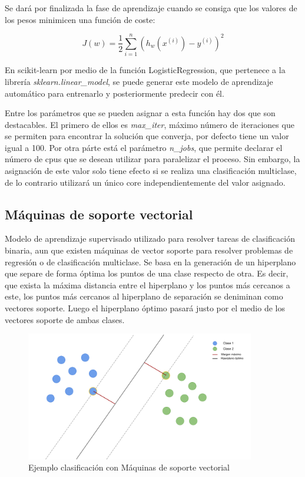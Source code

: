 \documentclass[a4paper, 12pt]{book}
\begin{document}
Se dará por finalizada la fase de aprendizaje cuando se consiga que los valores de los pesos minimicen una función de coste:

\begin{equation}
    J(w) = \frac{1}{2} \sum_{i= 1}^{n} {(h_w(x^{(i)}) - y^{(i)})}^2 
\end{equation}

En scikit-learn por medio de la función LogisticRegression\cite{LogisticRegressionDoc}, que pertenece a la librería \textit{sklearn.linear\_model}, se puede generar este modelo de aprendizaje automático para entrenarlo y posteriormente predecir con él. 

Entre los parámetros que se pueden asignar a esta función hay dos que son destacables. El primero de ellos es \textit{max\_iter}, máximo número de iteraciones que se permiten para encontrar la solución que converja, por defecto tiene un valor igual a 100. Por otra párte está el parámetro \textit{n\_jobs}, que permite declarar el número de cpus que se desean utilizar para paralelizar el proceso. Sin embargo, la asignación de este valor solo tiene efecto si se realiza una clasificación multiclase, de lo contrario utilizará un único core independientemente del valor asignado.

\subsection{Máquinas de soporte vectorial}
\label{subsec:maquitas_soporte_vectorial}

Modelo de aprendizaje supervisado utilizado para resolver tareas de clasificación binaria, aun que existen máquinas de vector soporte para resolver problemas de regresión o de clasificación multiclase. Se basa en la generación de un hiperplano que separe de forma óptima los puntos de una clase respecto de otra. Es decir, que exista la máxima distancia entre el hiperplano y los puntos más cercanos a este, los puntos más cercanos al hiperplano de separación se deniminan como vectores soporte. Luego el hiperplano óptimo pasará justo por el medio de los vectores soporte de ambas clases.

\begin{figure}[h!]
  \centering
  \includegraphics[width=10cm, keepaspectratio]{img/explicacion_svm.png}
  \caption{Ejemplo clasificación con Máquinas de soporte vectorial}\label{fig:explicacion_svm}
\end{figure}
\end{document}
